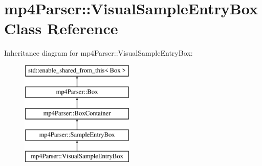 \hypertarget{classmp4_parser_1_1_visual_sample_entry_box}{}\section{mp4\+Parser\+::Visual\+Sample\+Entry\+Box Class Reference}
\label{classmp4_parser_1_1_visual_sample_entry_box}
Inheritance diagram for mp4\+Parser\+::Visual\+Sample\+Entry\+Box\+:\begin{figure}[H]
\begin{center}
\leavevmode
\includegraphics[height=5.000000cm]{classmp4_parser_1_1_visual_sample_entry_box}
\end{center}
\end{figure}
